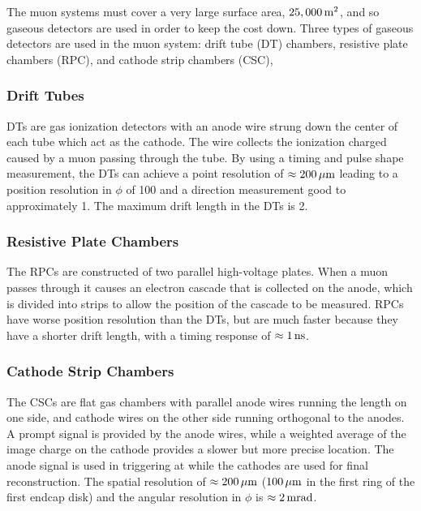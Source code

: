 The muon systems must cover a very large surface area, $25,000\text{\,m}^{2}$, and
so gaseous detectors are used in order to keep the cost down. Three types of
gaseous detectors are used in the muon system: drift tube (DT) chambers,
resistive plate chambers (RPC), and cathode strip chambers (CSC),

\subsubsection{Drift Tubes}

DTs are gas ionization detectors with an anode wire strung down the center of
each tube which act as the cathode. The wire collects the ionization charged
caused by a muon passing through the tube. By using a timing and pulse shape
measurement, the DTs can achieve a point resolution of $\approx
200\text{\,$\mu$m}$ leading to a position resolution in $\phi$ of 100\micrometers
and a direction measurement good to approximately 1\millirads. The maximum
drift length in the DTs is 2\centimeters.

\subsubsection{Resistive Plate Chambers}

The RPCs are constructed of two parallel high-voltage plates. When a muon
passes through it causes an electron cascade that is collected on the anode,
which is divided into strips to allow the position of the cascade to be
measured. RPCs have worse position resolution than the DTs, but are much
faster because they have a shorter drift length, with a timing response of
$\approx 1\text{\,ns}$.

\subsubsection{Cathode Strip Chambers}

The CSCs are flat gas chambers with parallel anode wires running the length on
one side, and cathode wires on the other side running orthogonal to the anodes.
A prompt signal is provided by the anode wires, while a weighted average of the
image charge on the cathode provides a slower but more precise location. The
anode signal is used in triggering at \Lone while the cathodes are used for
final reconstruction. The spatial resolution of $\approx 200\text{\,$\mu$m}$
($100\text{\,$\mu$m}$ in the first ring of the first endcap disk) and the angular
resolution in $\phi$ is $\approx 2\text{\,mrad}$.

